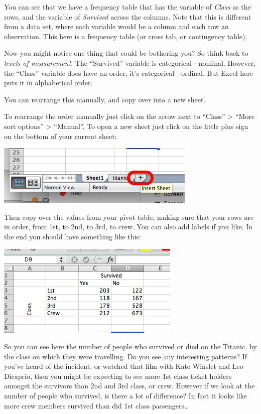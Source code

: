 \documentclass[]{book}
\theoremstyle{definition}
\theoremstyle{definition}
\theoremstyle{definition}
\theoremstyle{remark}
\begin{document}
You can see that we have a frequency table that has the variable of
\emph{Class} as the rows, and the variable of \emph{Survived} across the
columns. Note that this is different from a data set, where each
variable would be a column and each row an observation. This here is a
frequency table (or cross tab, or contingency table).

Now you might notice one thing that could be bothering you? So think
back to \emph{levels of measurement}. The ``Survived'' variable is
categorical - nominal. However, the ``Class'' variable does have an
order, it's categorical - ordinal. But Excel here puts it in
alphabetical order.

You can rearrange this manually, and copy over into a new sheet.

To rearrange the order manually just click on the arrow next to
``Class'' \textgreater{} ``More sort options'' \textgreater{}
``Manual''. To open a new sheet just click on the little plus sign on
the bottom of your current sheet:

\includegraphics{imgs/new_sheet_2.png}

Then copy over the values from your pivot table, making sure that your
rows are in order, from 1st, to 2nd, to 3rd, to crew. You can also add
labels if you like. In the end you should have something like this:

\includegraphics{imgs/titanic_freq.png}

So you can see here the number of people who survived or died on the
Titanic, by the class on which they were travelling. Do you see any
interesting patterns? If you've heard of the incident, or watched that
film with Kate Winslet and Leo Dicaprio, then you might be expecting to
see more 1st class ticket holders amongst the survivors than 2nd and 3rd
class, or crew. However if we look at the number of people who survived,
is there a lot of difference? In fact it looks like more crew members
survived than did 1st class passengers\ldots{}
\end{document}
